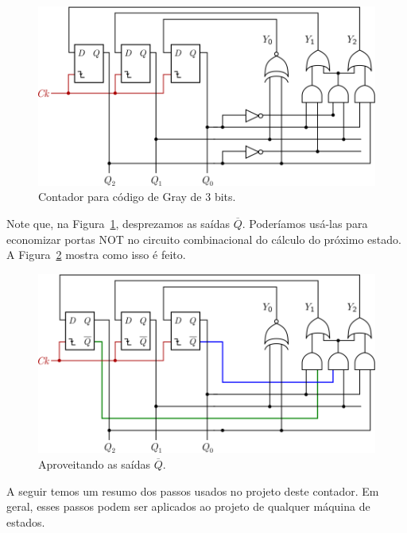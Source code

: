 \documentclass[a4paper]{article}
\newcommand{\Not}[1]{\overline{#1}}
\begin{document}
\begin{figure}[!htp]
\begin{center}
\includegraphics[width=\textwidth]{images/gray_counter_circuit}
\caption{Contador para código de Gray de $3$ bits.}
\label{fig:gray_circuit}
\end{center}
\end{figure}

Note que, na Figura~\ref{fig:gray_circuit}, desprezamos as saídas
$\Not{Q}$. Poderíamos usá-las para economizar portas NOT no
circuito combinacional do cálculo do próximo estado. A
Figura~\ref{fig:gray_circuit_savings} mostra como isso é feito.

\begin{figure}[!htp]
\begin{center}
\includegraphics[width=\textwidth]{images/gray_counter_savings}
\caption{Aproveitando as saídas $\Not{Q}$.}
\label{fig:gray_circuit_savings}
\end{center}
\end{figure}

A seguir temos um resumo dos passos usados no projeto deste contador.
Em geral, esses passos podem ser aplicados ao projeto de qualquer
máquina de estados.
\end{document}
